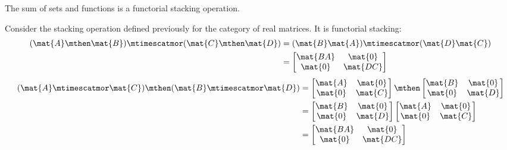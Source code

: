 \begin{example}
    The sum of sets and functions is a functorial stacking operation.
\end{example}


\begin{example}
    Consider the stacking operation defined previously for the category of real matrices.
    It is functorial stacking:
    \begin{align}
        (\mat{A} \mthen \mat{B}) \mtimescatmor (\mat{C} \mthen \mat{D}) & = (\mat{B}\mat{A}) \mtimescatmor (\mat{D}\mat{C}) \\
                                                                        & =
        \begin{bmatrix}
            \mat{BA} & \mat{0}  \\
            \mat{0}  & \mat{DC}
        \end{bmatrix}
    \end{align}
    \begin{align}
        (\mat{A} \mtimescatmor \mat{C}) \mthen (\mat{B} \mtimescatmor \mat{D}) & =
        \begin{bmatrix}
            \mat{A} & \mat{0} \\
            \mat{0} & \mat{C}
        \end{bmatrix}
        \mthen
        \begin{bmatrix}
            \mat{B} & \mat{0} \\
            \mat{0} & \mat{D}
        \end{bmatrix} \\
                                                                               & =
        \begin{bmatrix}
            \mat{B} & \mat{0} \\
            \mat{0} & \mat{D}
        \end{bmatrix}
        \begin{bmatrix}
            \mat{A} & \mat{0} \\
            \mat{0} & \mat{C}
        \end{bmatrix} \\
                                                                               & =
        \begin{bmatrix}
            \mat{BA} & \mat{0}  \\
            \mat{0}  & \mat{DC}
        \end{bmatrix}
    \end{align}
\end{example}

